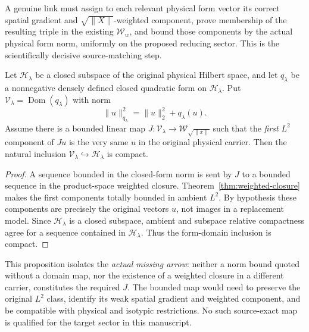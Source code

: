 A genuine link must assign to each relevant physical form vector its
correct spatial gradient and \(\sqrt{\|X\|}\)-weighted component,
prove membership of the resulting triple in the existing
\(\mathcal W_w\), and bound those components by the actual physical
form norm, uniformly on the proposed reducing sector. This is the
scientifically decisive source-matching step.

\begin{proposition}\label{prop:weighted-domain-bridge}
Let $\mathscr H_\lambda$ be a closed subspace of the original
physical Hilbert space, and let $q_\lambda$ be a nonnegative densely
defined closed quadratic form on $\mathscr H_\lambda$. Put
$\mathscr V_\lambda=\operatorname{Dom}(q_\lambda)$ with norm
\[
 \|u\|_{q_\lambda}^2=\|u\|_2^2+q_\lambda(u).
\]
Assume there is a bounded linear map
$J:\mathscr V_\lambda\to\mathcal W_{\sqrt{\|x\|}}$ such that the
\emph{first} $L^2$ component of $Ju$ is the very same $u$
in the original physical carrier. Then the natural inclusion
$\mathscr V_\lambda\hookrightarrow\mathscr H_\lambda$
is compact.
\end{proposition}
\begin{proof}
A sequence bounded in the closed-form norm is sent by $J$ to
a bounded sequence in the product-space weighted closure.
Theorem~\ref{thm:weighted-closure} makes the first components
totally bounded in ambient $L^2$. By hypothesis these components
are precisely the original vectors $u$, not images in a
replacement model. Since $\mathscr H_\lambda$ is a closed
subspace, ambient and subspace relative compactness agree
for a sequence contained in $\mathscr H_\lambda$.
Thus the form-domain inclusion is compact.
\end{proof}
This proposition isolates the \emph{actual missing arrow}:
neither a norm bound quoted without a domain map, nor the
existence of a weighted closure in a different carrier,
constitutes the required $J$. The bounded map would need
to preserve the original $L^2$ class, identify its weak
spatial gradient and weighted component, and be compatible
with physical and isotypic restrictions. No such source-exact
map is qualified for the target sector in this manuscript.


